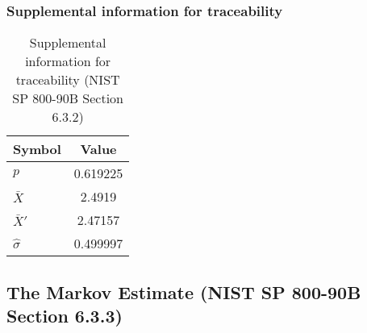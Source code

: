 \documentclass[a3paper,xelatex,english]{bxjsarticle}
\begin{document}
\subsubsection{Supplemental information for traceability}
\renewcommand{\arraystretch}{1.8}
\begin{table}[h]
\caption{Supplemental information for traceability (NIST SP 800-90B Section 6.3.2)}
\begin{center}
\begin{tabular}{|l|c|}
\hline 
\rowcolor{anotherlightblue} %
Symbol				& Value \\ \hline 
$p$				& 0.619225\\ \hline 
$\bar{X}$ 		&   2.4919\\ \hline
$\bar{X}'$		&  2.47157\\ \hline
$\hat{\sigma}$		& 0.499997\\ \hline
\end{tabular}
\end{center}
\end{table}
\renewcommand{\arraystretch}{1.4}
\clearpage
\subsection{The Markov Estimate (NIST SP 800-90B Section 6.3.3)}\label{sec:Binary633}
\end{document}
